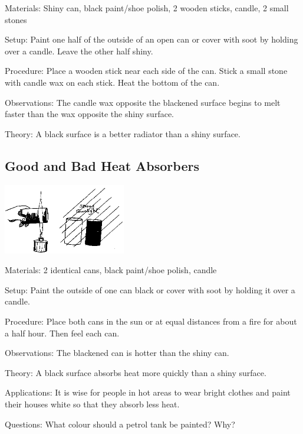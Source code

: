 \begin{multicols}{2}
\begin{description*}
\item[Materials:]{Shiny can, black paint/shoe polish, 2 wooden sticks, candle, 2 small stones}
\item[Setup:]{Paint one half of the outside of an open can or cover with soot by holding over a candle. Leave the other half shiny.}
\item[Procedure:]{Place a wooden stick near each side of the can. Stick a small stone with candle wax on each stick. Heat the bottom of the can.}
\item[Observations:]{The candle wax opposite the blackened surface begins to melt faster than the wax opposite the shiny surface.}
\item[Theory:]{A black surface is a better radiator than a shiny surface.}
\end{description*}

\subsection{Good and Bad Heat Absorbers}

\begin{center}
\includegraphics[width=0.4\textwidth]{./img/source/good-bad-absorbers.png}
\end{center}

\begin{description*}
\item[Materials:]{2 identical cans, black paint/shoe polish, candle}
\item[Setup:]{Paint the outside of one can black or cover with soot by holding it over a candle.}
\item[Procedure:]{Place both cans in the sun or at equal distances from a fire for about a half hour. Then feel each can.}
\item[Observations:]{The blackened can is hotter than the shiny can.}
\item[Theory:]{A black surface absorbs heat more quickly than a shiny surface.}
\item[Applications:]{It is wise for people in hot areas to wear bright clothes and paint their houses white so that they absorb less heat.}
\item[Questions:]{What colour should a petrol tank be painted? Why?}
\end{description*}


\end{multicols}
